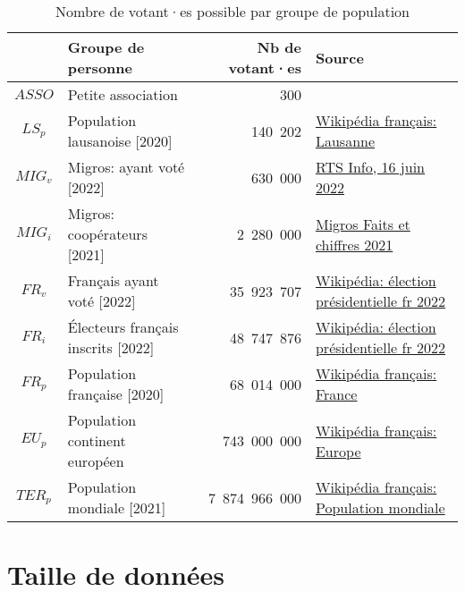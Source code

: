 \documentclass[../report]{subfiles}
\begin{document}
\begin{table}[H]
  \begin{center}
    \begin{tabular}{|c|l|r|l|}
      \hline
       & Groupe de personne                          & Nb de votant·es & Source \\
      \hline
      \hline
      $ASSO$ & Petite association                 & 300 & \\
      $LS_p$ & Population lausanoise [2020]       &         140~202 & \href{https://fr.wikipedia.org/wiki/Lausanne}{Wikipédia français: Lausanne}\\
      $MIG_v$ & Migros: ayant voté [2022]         &         630~000 & \href{https://www.rts.ch/info/suisse/13176954-la-vente-dalcool-reste-interdite-a-la-migros-apres-un-non-massif-en-votation.html}{RTS Info, 16 juin 2022}\\
      $MIG_i$ & Migros: coopérateurs [2021]       &       2~280~000 & \href{https://corporate.migros.ch/dam/jcr:d5b1ae79-a8e8-4b98-9f2d-4b4974d39486/faits-et-chiffres-2021.pdf}{Migros Faits et chiffres 2021}\\
      $FR_v$ & Français ayant voté [2022]         &      35~923~707 & \href{https://fr.wikipedia.org/wiki/Élection_présidentielle_française_de_2022}{Wikipédia: élection présidentielle fr 2022}\\
      $FR_i$ & Électeurs français inscrits [2022] &      48~747~876 & \href{https://fr.wikipedia.org/wiki/Élection_présidentielle_française_de_2022}{Wikipédia: élection présidentielle fr 2022}\\
      $FR_p$ & Population française [2020]        &      68~014~000 & \href{https://fr.wikipedia.org/wiki/France}{Wikipédia français: France}\\       
      $EU_p$ & Population continent européen      &     743~000~000 & \href{https://fr.wikipedia.org/wiki/Europe}{Wikipédia français: Europe}\\       
      $TER_p$ & Population mondiale [2021]        &   7~874~966~000 & \href{https://fr.wikipedia.org/wiki/Population_mondiale}{Wikipédia français: Population mondiale}\\       
      \hline
    \end{tabular}
  \end{center}
  \caption{Nombre de votant·es possible par groupe de population}\label{tab:}
\end{table}

\section{Taille de données} \label{sec:res:data-size}
\end{document}
